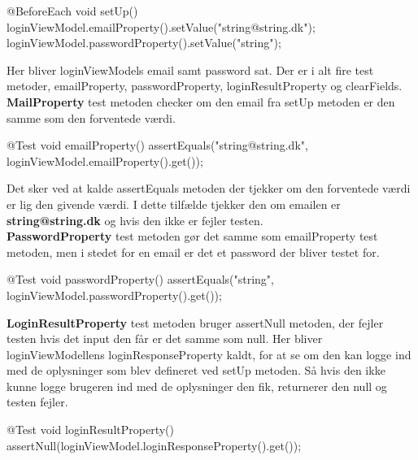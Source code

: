 \begin{code}[caption=LoginViewModel.java, firstnumber=28]
@BeforeEach
void setUp() {
    loginViewModel.emailProperty().setValue("string@string.dk");
    loginViewModel.passwordProperty().setValue("string");
}
\end{code}

Her bliver loginViewModels email samt password sat.
Der er i alt fire test metoder, emailProperty, passwordProperty, loginResultProperty og clearFields.\\
    
\textbf{MailProperty} test metoden checker om den email fra setUp metoden er den samme som den forventede værdi.\\


\begin{code}[caption=LoginViewModel.java, firstnumber=34]
@Test
void emailProperty() {
    assertEquals("string@string.dk", loginViewModel.emailProperty().get());
}
\end{code}

Det sker ved at kalde assertEquals metoden der tjekker om den forventede værdi er lig den givende værdi. I dette tilfælde tjekker den om emailen er \textbf{string@string.dk} og hvis den ikke er fejler testen.\\
    
\textbf{PasswordProperty} test metoden gør det samme som emailProperty test metoden, men i stedet for en email er det et password der bliver testet for.\\
\begin{code}[caption=LoginViewModel.java, firstnumber=39]
@Test
void passwordProperty() {
    assertEquals("string", loginViewModel.passwordProperty().get());
}
\end{code}
    
\textbf{LoginResultProperty} test metoden bruger assertNull metoden, der fejler testen hvis det input den får er det samme som null. Her bliver loginViewModellens loginResponseProperty kaldt, for at se om den kan logge ind med de oplysninger som blev defineret ved setUp metoden. Så hvis den ikke kunne logge brugeren ind med de oplysninger den fik, returnerer den null og testen fejler.\\

\begin{code}[caption=LoginViewModel.java, firstnumber=44]
@Test
void loginResultProperty() {
    assertNull(loginViewModel.loginResponseProperty().get());
}
\end{code}
    

